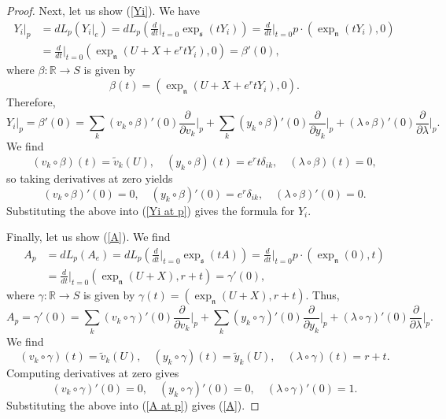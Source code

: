 \documentclass{amsart}
\newcommand{\R}{\mathbb R}
\newcommand{\s}{\mathfrak s}
\newcommand{\n}{\mathfrak n}
\theoremstyle{plain}
\theoremstyle{definition}
\theoremstyle{remark}
\begin{document}
\begin{proof}
		Next, let us show (\ref{Yi}). We have 
		\begin{align*}
			Y_i|_p &= dL_p(Y_i|_e)= dL_p \left(\frac{d}{dt}\bigg|_{t=0} \exp_\s(tY_i)\right) = \frac{d}{dt}\bigg|_{t=0}p \cdot (\exp_\n(tY_i),0) \\
			&= \frac{d}{dt}\bigg|_{t=0} \left( \exp_\n(U+X+e^rt Y_i),0\right) = \beta'(0),
		\end{align*}
		where $\beta:\R \rightarrow S$ is given by 
		$$\beta(t) = \left( \exp_\n(U+X+e^rt Y_i),0\right).$$
		Therefore, 
		\begin{equation}
			\label{Yi at p}
			Y_i|_p = \beta'(0) = \sum_k (v_k \circ \beta)'(0) \frac{\partial}{\partial v_k}\bigg|_p + \sum_k (y_k \circ \beta)'(0) \frac{\partial}{\partial y_k}\bigg|_p + (\lambda \circ \beta)'(0) \frac{\partial}{\partial \lambda}\bigg|_p.
		\end{equation}
		We find 
		$$(v_k \circ \beta)(t) = \widetilde v_k(U), \quad (y_k \circ \beta)(t) = e^r t \delta_{ik}, \quad (\lambda \circ \beta)(t) = 0,$$
		so taking derivatives at zero yields 
		$$(v_k \circ \beta)'(0) = 0,\quad (y_k \circ \beta)'(0) =e^r \delta_{ik}, \quad (\lambda \circ \beta)'(0) = 0.$$
		Substituting the above into (\ref{Yi at p}) gives the formula for $Y_i$.
		
		Finally, let us show (\ref{A}). We find 
		\begin{align*}
			A_p &= dL_p(A_e) = dL_p \left( \frac{d}{dt}\bigg|_{t=0} \exp_\s(tA)\right)
			= \frac{d}{dt}\bigg|_{t=0} p \cdot (\exp_\n(0),t) \\
			&= \frac{d}{dt}\bigg|_{t=0}(\exp_\n(U+X),r+t) = \gamma'(0),
		\end{align*}
		where $\gamma:\R \rightarrow S$ is given by $\gamma(t) = (\exp_\n(U+X),r+t)$. Thus, 
		\begin{equation}
			\label{A at p}
			A_p = \gamma'(0) = \sum_k (v_k \circ \gamma)'(0) \frac{\partial}{\partial v_k}\bigg|_p + \sum_k (y_k \circ \gamma)'(0) \frac{\partial}{\partial y_k}\bigg|_p + (\lambda \circ \gamma)'(0) \frac{\partial}{\partial \lambda}\bigg|_p.
		\end{equation}
		We find 
		$$(v_k \circ \gamma)(t) = \widetilde v_k(U),\quad (y_k \circ \gamma)(t) = \widetilde y_k(U),\quad (\lambda \circ \gamma)(t) = r+t.$$
		Computing derivatives at zero gives 
		$$(v_k \circ \gamma)'(0) = 0,\quad (y_k \circ \gamma)'(0) = 0, \quad (\lambda \circ \gamma)'(0) = 1.$$
		Substituting the above into (\ref{A at p}) gives (\ref{A}).
	\end{proof}
\end{document}
